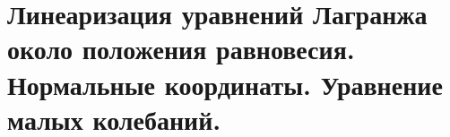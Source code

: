 \section{Линеаризация уравнений Лагранжа около положения равновесия. Нормальные координаты. Уравнение малых колебаний.}\label{chasec7}



\newpage
